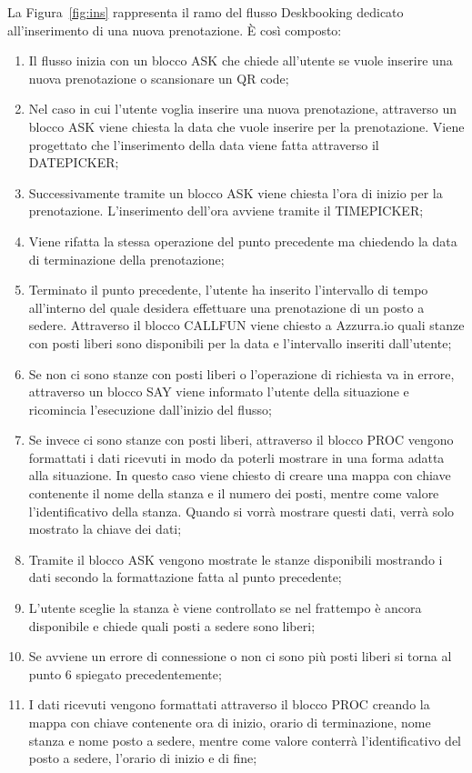 La Figura~\ref{fig:ins} rappresenta il ramo del flusso Deskbooking dedicato all'inserimento di una nuova prenotazione. È così composto:
\begin{enumerate}
	\item Il flusso inizia con un blocco ASK che chiede all'utente se vuole inserire una nuova prenotazione o scansionare un \gls{QR code}\ap{[g]};
	\item Nel caso in cui l'utente voglia inserire una nuova prenotazione, attraverso un blocco ASK viene chiesta la data che vuole inserire per la prenotazione. Viene progettato che l'inserimento della data viene fatta attraverso il DATEPICKER;
	\item Successivamente tramite un blocco ASK viene chiesta l'ora di inizio per la prenotazione. L'inserimento dell'ora avviene tramite il TIMEPICKER;
	\item Viene rifatta la stessa operazione del punto precedente ma chiedendo la data di terminazione della prenotazione;
	\item Terminato il punto precedente, l'utente ha inserito l'intervallo di tempo all'interno del quale desidera effettuare una prenotazione di un posto a sedere. Attraverso il blocco CALLFUN viene chiesto a Azzurra.io quali stanze con posti liberi sono disponibili per la data e l'intervallo inseriti dall'utente;
	\item Se non ci sono stanze con posti liberi o l'operazione di richiesta va in errore, attraverso un blocco SAY viene informato l'utente della situazione e ricomincia l'esecuzione dall'inizio del flusso;
	\item Se invece ci sono stanze con posti liberi, attraverso il blocco PROC vengono formattati i dati ricevuti in modo da poterli mostrare in una forma adatta alla situazione. In questo caso viene chiesto di creare una mappa con chiave contenente il nome della stanza e il numero dei posti, mentre come valore l'identificativo della stanza. Quando si vorrà mostrare questi dati, verrà solo mostrato la chiave dei dati;
	\item Tramite il blocco ASK vengono mostrate le stanze disponibili mostrando i dati secondo la formattazione fatta al punto precedente;
	\item L'utente sceglie la stanza è viene controllato se nel frattempo è ancora disponibile e chiede quali posti a sedere sono liberi;
	\item Se avviene un errore di connessione o non ci sono più posti liberi si torna al punto 6 spiegato precedentemente;
	\item I dati ricevuti vengono formattati attraverso il blocco PROC creando la mappa con chiave contenente ora di inizio, orario di terminazione, nome stanza e nome posto a sedere, mentre come valore conterrà l'identificativo del posto a sedere, l'orario di inizio e di fine;

\end{enumerate}
